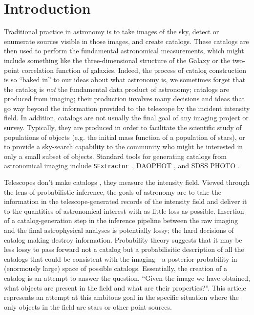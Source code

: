 \documentclass[12pt, preprint]{aastex}
\newcommand{\sex}{{\tt SExtractor}}
\begin{document}
\section{Introduction}
Traditional practice in astronomy is to take images of the sky, detect
or enumerate sources visible in those images, and create catalogs.
These catalogs are then used to perform the fundamental astronomical
measurements, which might include something like the three-dimensional
structure of the Galaxy or the two-point correlation function of
galaxies.  Indeed, the process of catalog construction is so ``baked
in'' to our ideas about what astronomy is, we sometimes forget that
the catalog is \emph{not} the fundamental data product of astronomy; catalogs are produced
from imaging; their production involves many decisions and ideas
that go way beyond the information provided to the telescope by the
incident intensity field. In addition, catalogs are not usually the final
goal of any imaging project or survey. Typically, they are produced in
order to facilitate the scientific study of populations of objects (e.g. the
initial mass function of a population of stars), or to provide a sky-search
capability to the community who might be interested in only a small subset of
objects. Standard tools for generating catalogs from astronomical imaging
include \sex~\citep{sextractor}, DAOPHOT \citep{1987PASP...99..191S}, and SDSS
PHOTO \citep{photo}.

Telescopes don't make catalogs \citep{2011EAS....45..351H}, they
measure the intensity field.  Viewed through the lens of probabilistic
inference, the goals of astronomy are to take the information in the
telescope-generated records of the intensity field and deliver it to
the quantities of astronomical interest with as little loss as
possible.  Insertion of a catalog-generation step in the inference
pipeline between the raw imaging and the final astrophysical analyses
is potentially lossy; the hard decisions of catalog making destroy
information.  Probability theory suggests that it may be less
lossy to pass forward not a catalog but a probabilisitic
description of all the catalogs that could be consistent with the
imaging---a posterior probability in (enormously large) space of possible catalogs.
Essentially, the creation of a catalog is an
attempt to answer the question,
``Given the image we have obtained, what objects are present in the field and
what are their properties?''.
This article represents an attempt at this ambitous goal in the specific
situation where the only objects in the field are stars or other point sources.
\end{document}
